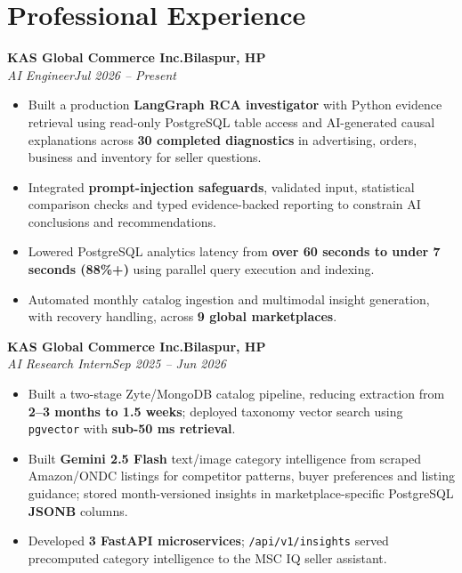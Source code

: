 \documentclass[a4paper,11pt]{article}
\newcommand{\position}[4]{\textbf{#1}\hfill\textbf{#2}\\[-1pt]\textit{#3}\hfill\textit{#4}\vspace{-3pt}}
\newenvironment{tightbullets}{\begin{itemize}[leftmargin=1.25em,label=\textbullet,topsep=2pt,itemsep=2pt,parsep=0pt,partopsep=0pt]}{\end{itemize}\vspace{-4pt}}
\begin{document}
\section{Professional Experience}
\position{KAS Global Commerce Inc.}{Bilaspur, HP}{AI Engineer}{Jul 2026 -- Present}
\begin{tightbullets}
\item Built a production \textbf{LangGraph RCA investigator} with Python evidence retrieval using read-only PostgreSQL table access and AI-generated causal explanations across \textbf{30 completed diagnostics} in advertising, orders, business and inventory for seller questions.
\item Integrated \textbf{prompt-injection safeguards}, validated input, statistical comparison checks and typed evidence-backed reporting to constrain AI conclusions and recommendations.
\item Lowered PostgreSQL analytics latency from \textbf{over 60 seconds to under 7 seconds (88\%+)} using parallel query execution and indexing.
\item Automated monthly catalog ingestion and multimodal insight generation, with recovery handling, across \textbf{9 global marketplaces}.
\end{tightbullets}
\vspace{2pt}
\position{KAS Global Commerce Inc.}{Bilaspur, HP}{AI Research Intern}{Sep 2025 -- Jun 2026}
\begin{tightbullets}
\item Built a two-stage Zyte/MongoDB catalog pipeline, reducing extraction from \textbf{2--3 months to 1.5 weeks}; deployed taxonomy vector search using \texttt{pgvector} with \textbf{sub-50 ms retrieval}.
\item Built \textbf{Gemini 2.5 Flash} text/image category intelligence from scraped Amazon/ONDC listings for competitor patterns, buyer preferences and listing guidance; stored month-versioned insights in marketplace-specific PostgreSQL \textbf{JSONB} columns.
\item Developed \textbf{3 FastAPI microservices}; \texttt{/api/v1/insights} served precomputed category intelligence to the MSC IQ seller assistant.
\end{tightbullets}
\end{document}
